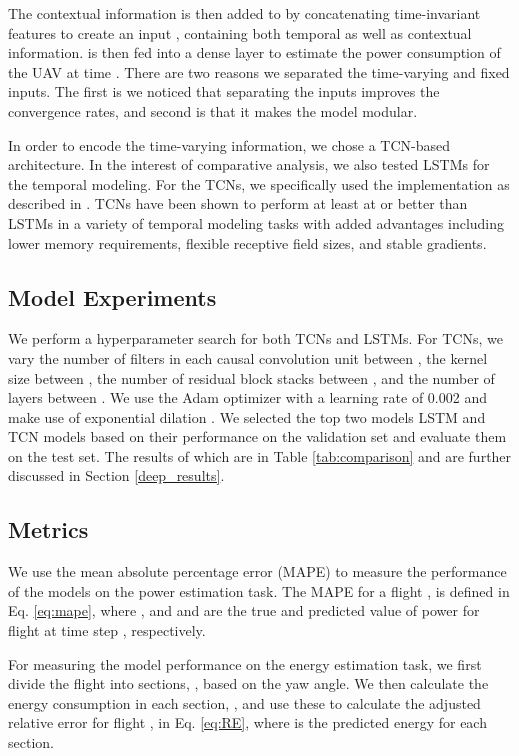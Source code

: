 \documentclass[letterpaper, 10 pt, conference]{ieeeconf}
\begin{document}
The contextual information is then added to  by concatenating time-invariant features to create an input , containing both temporal as well as contextual information.   is then fed into a dense layer to estimate the power consumption of the UAV at time . There are two reasons we separated the time-varying and fixed inputs. The first is we noticed that separating the inputs improves the convergence rates, and second is that it makes the model modular.

In order to encode the time-varying information, we chose a TCN-based \cite{oord2016pixel} architecture. In the interest of comparative analysis, we also tested LSTMs \cite{hochreiter1997long} for the temporal modeling. 
For the TCNs, we specifically used the implementation as described in \cite{bai2018empirical}. TCNs have been shown to perform at least at or better than LSTMs in a variety of temporal modeling tasks with added advantages including lower memory requirements, flexible receptive field sizes, and stable gradients. 






\subsection{Model Experiments}




We perform a hyperparameter search for both TCNs and LSTMs. For TCNs, we vary the number of filters in each causal convolution unit between , the kernel size between , the number of residual block stacks between , and the number of layers between . We use the Adam optimizer with a learning rate of 0.002 and make use of exponential dilation \cite{bai2018empirical}. We selected the top two models LSTM and TCN models based on their performance on the validation set and evaluate them on the test set. The results of which are in Table \ref{tab:comparison} and are further discussed in Section \ref{deep_results}.

\subsection{Metrics}
We use the mean absolute percentage error (MAPE) to measure the performance of the models on the power estimation task. The MAPE for a flight , is defined in Eq. \ref{eq:mape}, where , and  and  are the true and predicted value of power for flight  at time step , respectively. 


 For measuring the model performance on the energy estimation task, we first divide the flight into sections, , based on the yaw angle. We then calculate the energy consumption in each section, , and use these to calculate the adjusted relative error for flight ,  in Eq.  \ref{eq:RE}, where  is the predicted energy for each section. 
\end{document}
